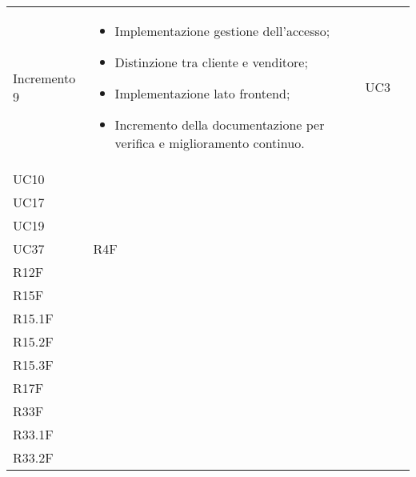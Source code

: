 \begin{longtable}{
    >{\centering}p{}
    >{\raggedright}p{}
    >{\centering}p{}
    >{\centering}p{}
    }
    Incremento 9                  &
    \vspace{-15px}
    \begin{itemize}
        \renewcommand\labelitemi{-}
        \item Implementazione gestione dell'accesso;
        \item Distinzione tra cliente e venditore;
        \item Implementazione lato frontend;
        \item Incremento della documentazione per verifica e miglioramento continuo.
    \end{itemize}
                                  & UC3                                                                                                                                                                                      \\ UC10                                                                                                                                                                 \\ UC17                                                                                                                                                                                  \\ UC19  \\ UC37
                                  & R4F                                                                                                                                                                                      \\ R12F \\ R15F                                                                                                                                                                                     \\ R15.1F \\ R15.2F \\ R15.3F \\ R17F \\ R33F \\ R33.1F \\ R33.2F
    \tabularnewline


\end{longtable}
